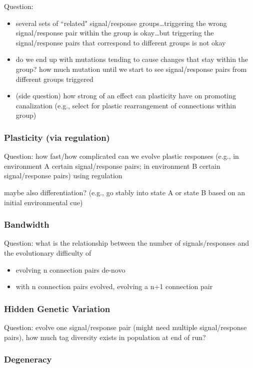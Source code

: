 Question:
\begin{itemize}
\item several sets of ``related" signal/response groups\ldots triggering the wrong signal/response pair within the group is okay\ldots but triggering the signal/response pairs that correspond to different groups is not okay
\item do we end up with mutations tending to cause changes that stay within the group? how much mutation until we start to see signal/response pairs from different groups triggered
\item (side question) how strong of an effect can plasticity have on promoting canalization (e.g., select for plastic rearrangement of connections within group)
\end{itemize}

\subsubsection{Plasticity (via regulation)}

Question: how fast/how complicated can we evolve plastic responses (e.g., in environment A certain signal/response pairs; in environment B certain signal/response pairs) using regulation

maybe also differentiation?
(e.g., go stably into state A or state B based on an initial environmental cue)

\subsubsection{Bandwidth}

Question: what is the relationship between the number of signals/responses and the evolutionary difficulty of
\begin{itemize}
\item evolving n connection pairs de-novo
\item with n connection pairs evolved, evolving a n+1 connection pair
\end{itemize}

\subsubsection{Hidden Genetic Variation}

Question: evolve one signal/response pair (might need multiple signal/response pairs), how much tag diversity exists in population at end of run?

\subsubsection{Degeneracy}

